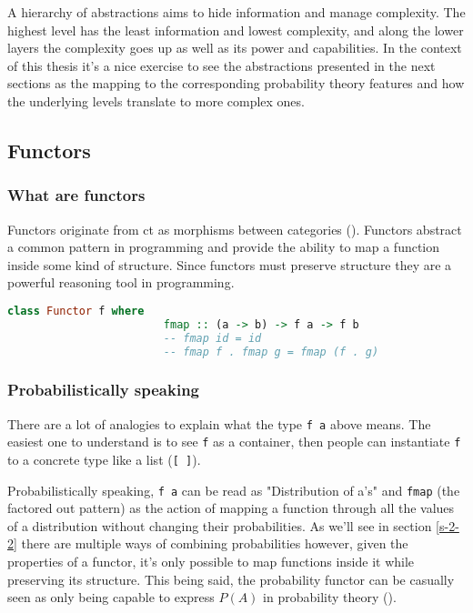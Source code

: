 \documentclass[
  oneside,
  11pt, a4paper,
  footinclude=true,
  headinclude=true,
  cleardoublepage=empty
]{scrbook}
\theoremstyle{definition}
\theoremstyle{definition}
\begin{document}
	    A hierarchy of abstractions aims to hide information and manage complexity. The highest level has the least information and lowest complexity, and along the lower layers the complexity goes up as well as its power and capabilities. In the context of this thesis it's a nice exercise to see the abstractions presented in the next sections as the mapping to the corresponding probability theory features and how the underlying levels translate to more complex ones.
	    
	    \subsection{Functors}
	    
	        \subsubsection{What are functors}
	        
	            Functors originate from \gls{ct} as morphisms between categories (\cite{Awodey:2010:CT:2060081}). Functors abstract a common pattern in programming and provide the ability to map a function inside some kind of structure. Since functors must preserve structure they are a powerful reasoning tool in programming.
	            
	            \begin{lstlisting}[mathescape, language=Haskell, caption={Functor laws},captionpos=b]
	                class Functor f where
	                    fmap :: (a -> b) -> f a -> f b
	                    -- fmap id = id
	                    -- fmap f . fmap g = fmap (f . g)
	            \end{lstlisting}{}
	            
	        \subsubsection{Probabilistically speaking}
	        
	           There are a lot of analogies to explain what the type \texttt{f a} above means. The easiest one to understand is to see \texttt{f} as a container, then people can instantiate \texttt{f} to a concrete type like a list (\texttt{[ ]}).
	           
	           Probabilistically speaking, \texttt{f a} can be read as "Distribution of a's" and \texttt{fmap} (the factored out pattern) as the action of mapping a function through all the values of a distribution without changing their probabilities. As we'll see in section \ref{s-2-2} there are multiple ways of combining probabilities however, given the properties of a functor, it's only possible to map functions inside it while preserving its structure. This being said, the probability functor can be casually seen as only being capable to express $P(A)$ in probability theory (\cite{jtobin}).
	
\end{document}
